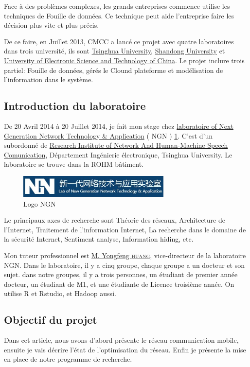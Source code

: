 Face à des problèmes complexes, les grands entreprises commence utilise les techniques de Fouille de données. Ce technique peut aide l'entreprise faire les décision plus vite et plus précis.

De ce faire, en Juillet 2013, CMCC a lancé ce projet avec quatre laboratoires dans trois université, ils sont
 \href{http://www.tsinghua.edu.cn/publish/newthuen/index.html}{Tsinghua University}, \href{http://en.sdu.edu.cn/}{Shandong University} et \href{http://www.oice.uestc.edu.cn/en/}{University of Electronic Science and Technology of China}. Le projet inclure trois partiel: Fouille de données, gérés le Clound plateforme et modélisation de l'information dans le système.
 

  \subsection{Introduction du laboratoire}
 De 20 Avril 2014 à 20 Juillet 2014, je fait mon stage chez \href{http://203.91.121.76/joomla/}{laboratoire of Next Generation Network Technology \& Application} \textsf{( NGN )} \ref{Logo NGN}. C'est d'un subordonné de \href{http://www.ee.tsinghua.edu.cn/publish/eeen/3776/index.html}{Research Institute of Network And Human-Machine Speech Comunication}, Département Ingénierie électronique, Tsinghua University. Le laboratoire se trouve dans la ROHM bâtiment.
  \begin{figure}[H]
      \centering
      \includegraphics[width=3in]{images/NGN.jpg}
      \caption{Logo NGN}
      \label{Logo NGN}
  \end{figure}
Le principaux axes de recherche sont Théorie des réseaux, Architecture de l'Internet, Traitement de l'information Internet, La recherche dans le domaine de la sécurité Internet, Sentiment analyse, Information hiding, etc.

 Mon tuteur professionnel est \href{http://203.91.121.76/joomla/index.php/staff/teacher/83-huangyongfeng}{M. Yongfeng \textsc{huang}}, vice-directeur de la laboratoire NGN. Dans le laboratoire, il y a cinq groupe, chaque groupe a un docteur et son sujet. dans notre groupes, il y a trois personnes, un étudiant de premier année docteur, un étudiant de M1, et une étudiante de Licence troisième année. On utilise R et Rstudio, et Hadoop aussi.
 
 \subsection{Objectif du projet}
Dans cet article, nous avons d'abord présente le réseau communication mobile, ensuite je vais décrire l'état de l'optimisation du réseau. Enfin je présente la mise en place de notre programme de recherche. 